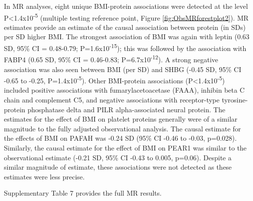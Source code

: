 \documentclass[11pt,twoside]{bristolthesis}
\begin{document}
In MR analyses, eight unique BMI-protein associations were detected at the level P\textless1.4x10\textsuperscript{-5} (multiple testing reference point, Figure \ref{fig:ObsMRforestplot2}). MR estimates provide an estimate of the causal association between protein (in SDs) per SD higher BMI. The strongest association of BMI was again with leptin (0.63 SD, 95\% CI = 0.48-0.79; P=1.6x10\textsuperscript{-15}); this was followed by the association with FABP4 (0.65 SD, 95\% CI = 0.46-0.83; P=6.7x10\textsuperscript{-12}). A strong negative association was also seen between BMI (per SD) and SHBG (-0.45 SD, 95\% CI -0.65 to -0.25, P=1.4x10\textsuperscript{-5}). Other BMI-protein associations (P\textless1.4x10\textsuperscript{-5}) included positive associations with fumarylacetoacetase (FAAA), inhibin beta C chain and complement C5, and negative associations with receptor-type tyrosine-protein phosphatase delta and PILR alpha-associated neural protein. The estimates for the effect of BMI on platelet proteins generally were of a similar magnitude to the fully adjusted observational analysis. The causal estimate for the effects of BMI on PAFAH was -0.24 SD (95\% CI -0.46 to -0.03, p=0.028). Similarly, the causal estimate for the effect of BMI on PEAR1 was similar to the observational estimate (-0.21 SD, 95\% CI -0.43 to 0.005, p=0.06). Despite a similar magnitude of estimate, these associations were not detected as these estimates were less precise.

Supplementary Table 7 provides the full MR results.
\end{document}
